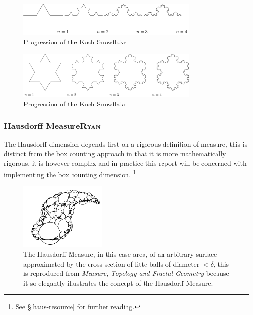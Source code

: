 \documentclass[a4paper,11pt,twoside]{article}
\begin{document}
\begin{figure}[htbp]
\centering
\includegraphics[width=9cm]{media/tikz/Koch_line.png}
\caption{\label{koch-line}Progression of the Koch Snowflake}
\end{figure}

\begin{figure}[htbp]
\centering
\includegraphics[width=9cm]{media/tikz/Snowflake.png}
\caption{\label{koch-snowflake}Progression of the Koch Snowflake}
\end{figure}

 \newpage 
\subsubsection{Hausdorff Measure\hfill{}\textsc{Ryan}}
\label{hausdorff-measure}
The Hausdorff dimension depends first on a rigorous definition of measure, this is distinct from the box counting approach in that it is more mathematically rigorous, it is however complex and in practice this report will be concerned with implementing the box counting dimension. \footnote{See \S \ref{haus-resource} for further reading.}

\begin{figure}
\centering
\includegraphics[width=0.38\textwidth]{media/edgar_181_of_292.png}
\caption{\label{fig:ball-covering}The Hausdorff Measure, in this case area, of an arbitrary surface approximated by the cross section of litte balls of diameter \(< \delta\), this is reproduced from \emph{Measure, Topology and Fractal Geometry} \cite[p. 166]{edgarMeasureTopologyFractal2008a} because it so elegantly illustrates the concept of the Hausdorff Measure.}
\end{figure}
\end{document}
